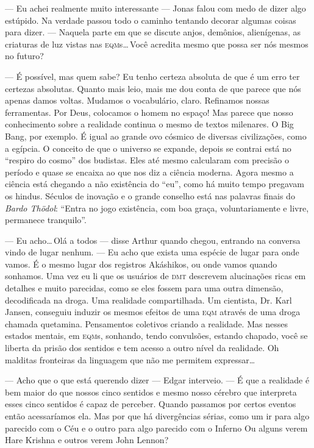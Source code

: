 --- Eu achei realmente muito interessante --- Jonas falou\mudanca{,} com medo de dizer algo estúpido. Na verdade\mudanca{,} passou todo o caminho tentando decorar algumas coisas para dizer. ---  Naquela parte em que se discute anjos, demônios, alienígenas, as criaturas de luz vistas nas \textsc{eqm}s\ldots\,Você acredita mesmo que possa ser nós mesmos no futuro?

--- É possível, mas quem sabe? Eu tenho certeza absoluta de que é um erro ter certezas absolutas. Quanto mais leio, mais me dou conta de que parece que nós apenas damos voltas. Mudamos o vocabulário, claro. Refinamos nossas ferramentas. Por Deus, colocamos o homem no espaço! Mas parece que nosso conhecimento sobre a realidade continua o mesmo de textos milenares. O Big Bang, por exemplo. É igual ao grande ovo cósmico de diversas civilizações, como a egípcia. O conceito de que o universo se expande, depois se contrai está no ``respiro do cosmo'' dos budistas. Eles até mesmo calcularam com precisão o período e quase se encaixa ao que nos diz a ciência moderna. Agora mesmo\mudanca{,} a ciência está chegando a não existência do ``eu'', como há muito tempo pregavam os hindus. Séculos de inovação e o grande conselho está nas palavras finais do \emph{Bardo Thödol}: ``Entra no jogo existência, com boa graça, voluntariamente e livre, permanece tranquilo''.

--- Eu acho\ldots\,Olá a todos --- disse Arthur quando chegou, entrando na conversa\mudanca{,} vindo de lugar nenhum. --- Eu acho que exista uma espécie de lugar para onde vamos. É o mesmo lugar dos registros Akáshikos, ou onde vamos quando sonhamos. Uma vez eu li que os usuários de \textsc{dmt} descrevem alucinações ricas em detalhes e muito parecidas, como se eles fossem para uma outra dimensão, decodificada na droga. Uma realidade compartilhada. Um cientista, Dr. Karl Jansen, conseguiu induzir os mesmos efeitos de uma \textsc{eqm} através de uma droga chamada quetamina. Pensamentos coletivos criando a realidade. Mas nesses estados mentais, em \textsc{eqm}s, sonhando, tendo convulsões, estando chapado, você se liberta da prisão dos sentidos e tem acesso a outro nível da realidade. Oh\mudanca{,} malditas fronteiras da linguagem\mudanca{,} que não me permitem expressar\ldots

--- Acho que o que está querendo dizer --- Edgar interveio. --- É que a realidade é bem maior do que nossos cinco sentidos e mesmo nosso cérebro que interpreta esses cinco sentidos é capaz de perceber. Quando passamos por certos eventos então acessaríamos ela. Mas por que há divergências sérias, como um ir para algo parecido com o Céu e o outro para algo parecido com o Inferno Ou alguns verem Hare Krishna e outros verem John Lennon?

